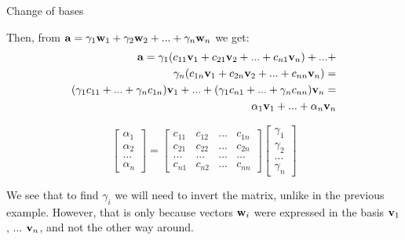 \documentclass{beamer}
\begin{document}
\begin{frame}{Change of bases}
	\begin{flushleft}
		
		Then, from $\mathbf{a} = \gamma_1 \mathbf{w}_1 + \gamma_2 \mathbf{w}_2 + ... + \gamma_n \mathbf{w}_n$ we get:
			\begin{align*}
		\mathbf{a} = 
			 \gamma_1 (c_{11} \mathbf{v}_1 + c_{21}  \mathbf{v}_2 + ... + c_{n1} \mathbf{v}_n) + ... + \\
			 \gamma_n (c_{1n} \mathbf{v}_1 + c_{2n}  \mathbf{v}_2 + ... + c_{nn} \mathbf{v}_n)
			= \\
			( \gamma_1 c_{11} + ... + \gamma_n c_{1n}) \mathbf{v}_1 
			+ ... + 
			( \gamma_1 c_{n1} + ... + \gamma_n c_{nn}) \mathbf{v}_n 
			= \\
			\alpha_1 \mathbf{v}_1 + ... + \alpha_n \mathbf{v}_n
		\end{align*}		
		
		\begin{equation}
	\begin{bmatrix}
		\alpha_1 \\ \alpha_2 \\ ...\\ \alpha_n
	\end{bmatrix}
	=
	\begin{bmatrix}
		c_{11} & c_{12} & ... & c_{1n} \\
		c_{21} & c_{22} & ... & c_{2n} \\
		... & ... & ... & ... \\
		c_{n1} & c_{n2} & ... & c_{nn} 
	\end{bmatrix}
	\begin{bmatrix}
		\gamma_1 \\ \gamma_2 \\ ...\\ \gamma_n
	\end{bmatrix}
\end{equation}		
		
		We see that to find $\gamma_i$ we will need to invert the matrix, unlike in the previous example. However, that is only because vectors $\mathbf{w}_i$ were expressed in the basis $\mathbf{v}_1$, ... $\mathbf{v}_n$, and not the other way around.
		
	\end{flushleft}
\end{frame}
\end{document}
